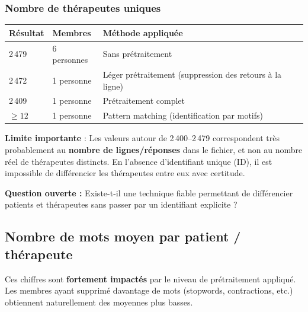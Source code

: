 \documentclass[12pt,a4paper]{article}
\begin{document}
\subsubsection*{Nombre de thérapeutes uniques}

\begin{center}
\begin{tabular}{lll}
\toprule
\textbf{Résultat} & \textbf{Membres} & \textbf{Méthode appliquée} \\
\midrule
2\,479 & 6 personnes & Sans prétraitement \\
2\,472 & 1 personne  & Léger prétraitement (suppression des retours à la ligne) \\
2\,409 & 1 personne  & Prétraitement complet \\
$\geq 12$ & 1 personne & Pattern matching (identification par motifs) \\
\bottomrule
\end{tabular}
\end{center}

\begin{avertissement}
\textbf{Limite importante} : Les valeurs autour de 2\,400--2\,479 correspondent très probablement au \textbf{nombre de lignes/réponses} dans le fichier, et non au nombre réel de thérapeutes distincts. En l'absence d'identifiant unique (ID), il est impossible de différencier les thérapeutes entre eux avec certitude.
\end{avertissement}

\textbf{Question ouverte :} Existe-t-il une technique fiable permettant de différencier patients et thérapeutes sans passer par un identifiant explicite ?


\pagebreak
\subsection{Nombre de mots moyen par patient / thérapeute}

Ces chiffres sont \textbf{fortement impactés} par le niveau de prétraitement appliqué. Les membres ayant supprimé davantage de mots (stopwords, contractions, etc.) obtiennent naturellement des moyennes plus basses.
\end{document}
